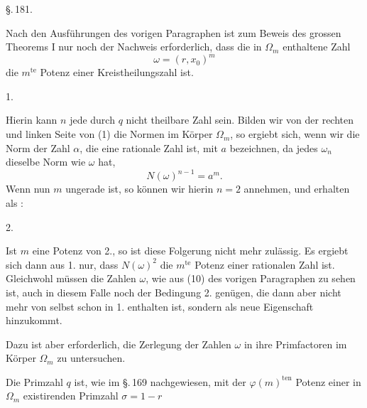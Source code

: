 
\begin{center}
\S.\,181.\\
\end{center}

Nach den Ausführungen des vorigen Paragraphen ist zum Beweis des grossen Theorems I nur noch der Nachweis erforderlich, dass die in $\Omega_m$ enthaltene Zahl
\[
\omega = (r, x_0)^m
\]
die $m^{\text{te}}$ Potenz einer Kreistheilungszahl ist.

1. 

Hierin kann $n$ jede durch $q$ nicht theilbare Zahl sein. Bilden wir von der rechten und linken Seite von (1) die Normen im Körper $\Omega_m$, so ergiebt sich, wenn wir die Norm der Zahl $\alpha$, die eine rationale Zahl ist, mit $a$ bezeichnen, da jedes $\omega_n$ dieselbe Norm wie $\omega$ hat,
\[
N(\omega)^{n-1} = a^m.
\]
Wenn nun $m$ ungerade ist, so können wir hierin $n = 2$ annehmen, und erhalten als :

2. 

Ist $m$ eine Potenz von 2., so ist diese Folgerung nicht mehr zulässig. Es ergiebt sich dann aus 1. nur, dass $N(\omega)^2$ die $m^{\text{te}}$ Potenz einer rationalen Zahl ist. Gleichwohl müssen die Zahlen $\omega$, wie aus (10) des vorigen Paragraphen zu sehen ist, auch in diesem Falle noch der Bedingung 2. genügen, die dann aber nicht mehr von selbst schon in 1. enthalten ist, sondern als neue Eigenschaft hinzukommt.


Dazu ist aber erforderlich, die Zerlegung der Zahlen $\omega$ in ihre Primfactoren im Körper $\Omega_m$ zu untersuchen.

Die Primzahl $q$ ist, wie im \S.\,169 nachgewiesen, mit der $\varphi(m)^{\text{ten}}$ Potenz einer in $\Omega_m$ existirenden Primzahl $\sigma = 1 - r$
